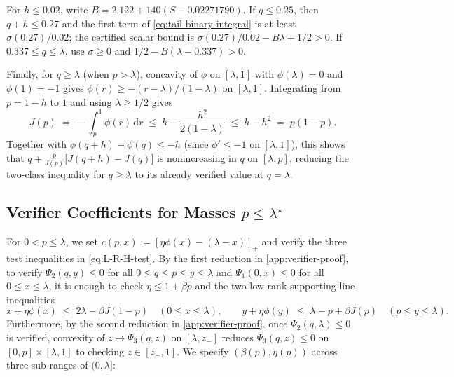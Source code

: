 \documentclass[11pt]{article}
\numberwithin{equation}{section}
\theoremstyle{plain}
\theoremstyle{definition}
\newcommand{\1}{\mathbf{1}}
\begin{document}
For $h\le0.02$, write $B=2.122+140(S-0.02271790)$. If $q\le0.25$, then $q+h\le0.27$ and the first term of \cref{eq:tail-binary-integral} is at least $\sigma(0.27)/0.02$; the certified scalar bound is $\sigma(0.27)/0.02-B\lambda+1/2>0$. If $0.337\le q\le\lambda$, use $\sigma\ge0$ and $1/2-B(\lambda-0.337)>0$.

Finally, for $q \ge \lambda$ (when $p > \lambda$), concavity of $\phi$ on $[\lambda, 1]$ with $\phi(\lambda) = 0$ and $\phi(1) = -1$ gives $\phi(r) \ge -(r - \lambda)/(1 - \lambda)$ on $[\lambda, 1]$. Integrating from $p = 1 - h$ to $1$ and using $\lambda \ge 1/2$ gives
\[
  J(p) \;=\; -\int_p^1 \phi(r)\,\mathrm{d}r \;\le\; h - \frac{h^2}{2(1 - \lambda)} \;\le\; h - h^2 \;=\; p(1 - p).
\]
Together with $\phi(q + h) - \phi(q) \le -h$ (since $\phi' \le -1$ on $[\lambda, 1]$), this shows that $q + \frac{p}{J(p)}\bigl[J(q + h) - J(q)\bigr]$ is nonincreasing in $q$ on $[\lambda, p]$, reducing the two-class inequality for $q \ge \lambda$ to its already verified value at $q = \lambda$.

\subsection{Verifier Coefficients for Masses \texorpdfstring{$p \le \lambda^\star$}{p <= lambda*}}
\label{app:small-middle-masses}

For $0 < p \le \lambda$, we set $c(p, x) := [\eta\phi(x) - (\lambda - x)]_+$ and verify the three test inequalities in \cref{eq:L-R-H-test}. By the first reduction in \cref{app:verifier-proof}, to verify $\Psi_2(q, y) \le 0$ for all $0 \le q \le p \le y \le \lambda$ and $\Psi_1(0, x) \le 0$ for all $0 \le x \le \lambda$, it is enough to check $\eta \le 1 + \beta p$ and the two low-rank supporting-line inequalities
\begin{equation}
  x + \eta\phi(x) \;\le\; 2\lambda - \beta J(1 - p) \quad (0 \le x \le \lambda),
  \qquad
  y + \eta\phi(y) \;\le\; \lambda - p + \beta J(p) \quad (p \le y \le \lambda).
  \label{eq:upper-low-support}
\end{equation}
Furthermore, by the second reduction in \cref{app:verifier-proof}, once $\Psi_2(q, \lambda) \le 0$ is verified, convexity of $z \mapsto \Psi_3(q, z)$ on $[\lambda, z_-]$ reduces $\Psi_3(q, z) \le 0$ on $[0, p] \times [\lambda, 1]$ to checking $z \in [z_-, 1]$. We specify $(\beta(p), \eta(p))$ across three sub-ranges of $(0, \lambda]$:
\end{document}
